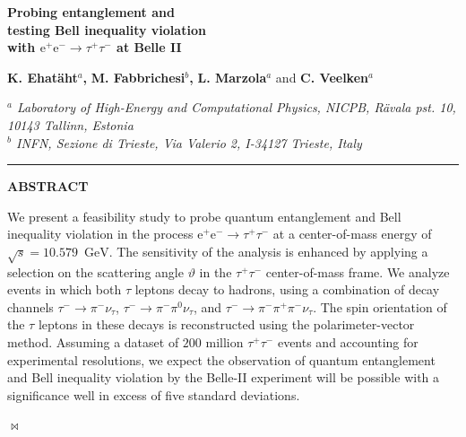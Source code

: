 \documentclass[a4paper,12pt,twocolumn]{article}
\numberwithin{equation}{section} %
\newcommand{\bc}{\begin{center}}
\newcommand{\ec}{\end{center}}
\newcommand{\Pem}{\ensuremath{\textrm{e}^{-}}\xspace}
\newcommand{\Pep}{\ensuremath{\textrm{e}^{+}}\xspace}
\newcommand{\Pgngt}{\ensuremath{\nu_{\tau}}\xspace}
\newcommand{\Pgpm}{\ensuremath{\pi^{-}}\xspace}
\newcommand{\Pgpp}{\ensuremath{\pi^{+}}\xspace}
\newcommand{\Pgpz}{\ensuremath{\pi^{\textrm{0}}}\xspace}
\newcommand{\Pgt}{\ensuremath{\tau}\xspace}
\newcommand{\Pgtm}{\ensuremath{\tau^{-}}\xspace}
\newcommand{\Pgtp}{\ensuremath{\tau^{+}}\xspace}
\newcommand{\GeV}{\ensuremath{\textrm{GeV}}\xspace}
\begin{document}
\onecolumn
\thispagestyle{empty}
\begin{center}
{ \Large \color{oucrimsonred} \textbf{ 
 Probing entanglement and \\[+1pt]
 testing Bell inequality violation\\[+6pt] with $\Pep\Pem \to \Pgtp\Pgtm$ at Belle II
}}

\vspace*{1.5cm}
{\bf K. Ehat\"aht$^{a}$,}
{\bf M. Fabbrichesi$^{b}$,}
{\bf L. Marzola$^{{a}}$}
and 
 {\bf C. Veelken$^{a}$}
 

\vspace{0.5cm}
{\small 
{\it \color{DarkGray}
$^{a}$ Laboratory of High-Energy and Computational Physics, NICPB, R\"avala pst. 10, \\ 10143 Tallinn, Estonia}
\\[1mm]
{\it  \color{DarkGray} $^{b}$
INFN, Sezione di Trieste, Via Valerio 2, I-34127 Trieste, Italy}
}
\end{center}

 \vskip0.5cm
\bc
{\color{DarkGray}
\rule{0.7\textwidth}{0.5pt}}
\ec
\vskip1cm
\bc
{\bf ABSTRACT}
\ec

\vspace*{5mm}

\noindent We present a feasibility study to probe quantum entanglement and Bell inequality violation in the process $\Pep\Pem \to \Pgtp\Pgtm$ at a center-of-mass energy of $\sqrt{s} = 10.579$~\GeV. The sensitivity of the analysis is enhanced by applying a selection on the scattering angle $\vartheta$ in the $\Pgtp\Pgtm$ center-of-mass  frame. We analyze events in which both $\Pgt$ leptons decay to hadrons, using a combination of decay channels $\Pgtm \to \Pgpm\Pgngt$, $\Pgtm \to \Pgpm\Pgpz\Pgngt$, and $\Pgtm \to \Pgpm\Pgpp\Pgpm\Pgngt$. The spin orientation of the $\Pgt$ leptons in these decays is reconstructed using the polarimeter-vector method. Assuming a dataset of $200$ million $\Pgtp\Pgtm$ events and accounting for experimental resolutions, we expect the observation of quantum entanglement and Bell inequality violation by the Belle-II experiment will be possible with a significance well in excess of five standard deviations.
  
  \vskip 3cm
\bc 
{\color{DarkGray} \vbox{$\bowtie$}}
\ec




\end{document}
